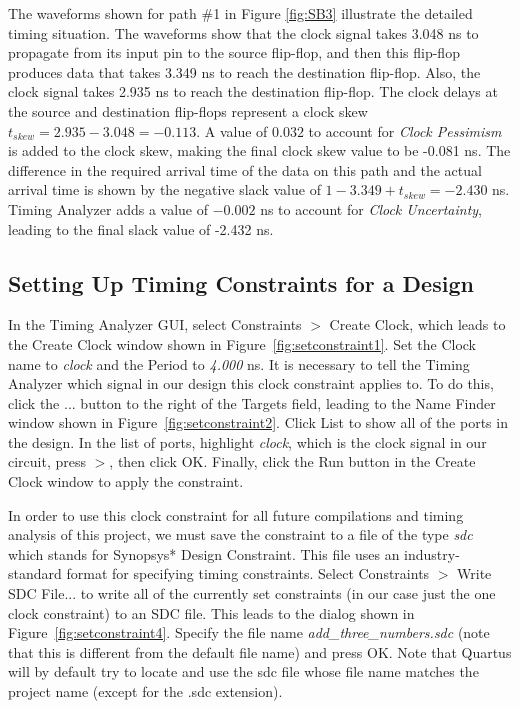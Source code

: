 \documentclass[11pt, twoside, pdftex]{article}
\begin{document}
The waveforms shown for path \#1 in Figure \ref{fig:SB3} illustrate the detailed timing
situation. The waveforms show that the clock signal takes 3.048 ns to propagate from its
input pin to the source flip-flop, and then this flip-flop produces data that takes 3.349 ns to reach the
destination flip-flop. Also, the clock signal takes 2.935 ns to reach the destination
flip-flop. The clock delays at the source and destination flip-flops
represent a clock skew $t_{skew} = 2.935 - 3.048 = -0.113$. A value of $0.032$
to account for {\it Clock Pessimism} is added to the clock skew, 
making the final clock skew value to be -0.081 ns.
The difference in the required arrival time of the data on this path and the
actual arrival time is shown by the negative slack value of 
$1 - 3.349 + t_{skew} = -2.430$ ns. Timing Analyzer adds a value of $-0.002$ ns to account for 
{\it Clock Uncertainty}, leading to the final slack value of -2.432 ns.

\subsection{Setting Up Timing Constraints for a Design}
In the Timing Analyzer GUI, select {\sf Constraints $>$ Create Clock}, which leads to the
Create Clock window shown in Figure~\ref{fig:setconstraint1}. Set the Clock name to
{\it clock} and the Period to {\it 4.000} ns. It is necessary to tell the Timing Analyzer which signal in
our design this clock constraint applies to. To do this, click the {\sf ...} button to the right of 
the {\sf Targets} field, leading to the Name Finder window shown in Figure~\ref{fig:setconstraint2}.
Click {\sf List} to show all of the ports in the design. In the list of ports, highlight {\it clock}, which is the
clock signal in our circuit, press {\sf $>$}, then click {\sf OK}. Finally, click the {\sf Run}
button in the Create Clock window to apply the constraint.

In order to use this clock constraint for all future compilations and timing 
analysis of this project, we must save the constraint to a file of the type
{\it sdc} which stands for {\sf Synopsys* Design Constraint}. This file uses an industry-standard
format for specifying timing constraints. Select {\sf Constraints $>$ Write SDC File...} to write
all of the currently set constraints (in our case just the one clock constraint) to an SDC file.
This leads to the dialog shown in Figure~\ref{fig:setconstraint4}. Specify the file name {\it add\_three\_numbers.sdc} (note that this is different from the default file name)
and press {\sf OK}. Note that Quartus will by default try to locate and use the sdc file whose file name
matches the project name (except for the .sdc extension).
\end{document}
